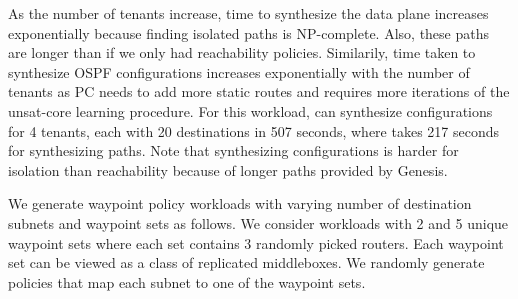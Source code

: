 As the number of tenants increase, time to 
synthesize the data plane increases exponentially 
because finding isolated paths is NP-complete. Also, these
paths are longer than if we only had reachability policies. 
Similarily, time taken to synthesize 
OSPF configurations increases exponentially with the 
number of tenants as PC needs to add more static routes 
and requires more iterations of the unsat-core learning
procedure. 
For this workload, \name can
synthesize configurations for 4 tenants, each with
20 destinations in 507 seconds, where \genesis takes 217 seconds
for synthesizing paths. Note that synthesizing 
configurations is harder for isolation than reachability 
because of longer paths provided by Genesis.

We generate waypoint policy 
workloads with varying number of destination subnets and 
waypoint sets as follows. 
We consider workloads with 2 and 5 unique waypoint 
sets where each set contains 3 randomly picked routers.  
Each waypoint set can be 
viewed as a class of replicated middleboxes.
We randomly generate policies 
that map each subnet to one of the waypoint sets. 

\begin{figure}
	\centering
\end{figure}

